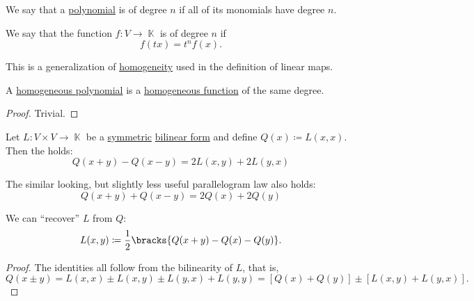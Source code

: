 \begin{definition}\label{def:homogeneous_polynomial}\mimprovised
  We say that a \hyperref[def:polynomial_algebra]{polynomial} is  of degree \( n \) if all of its monomials have degree \( n \).
\end{definition}

\begin{definition}\label{def:homogenous_function}\mimprovised
  We say that the function \( f: V \to \BbbK \) is  of degree \( n \) if
  \begin{equation*}
    f(t x) = t^n f(x).
  \end{equation*}

  This is a generalization of \hyperref[eq:def:semimodule/homomorphism/homogeneity]{homogeneity} used in the definition of linear maps.
\end{definition}

\begin{proposition}\label{thm:homogeneous_polynomial_is_homogeneous_function}
  A \hyperref[def:homogeneous_polynomial]{homogeneous polynomial} is a \hyperref[def:homogenous_function]{homogeneous function} of the same degree.
\end{proposition}
\begin{proof}
  Trivial.
\end{proof}

\begin{proposition}\label{thm:polarization_identity}
  Let \( L: V \times V \to \BbbK \) be a \hyperref[def:symmetric_function]{symmetric} \hyperref[def:bilinear_form]{bilinear form} and define \( Q(x) \coloneqq L(x, x) \). Then the  holds:
  \begin{equation}\label{thm:polarization_identity/polarization_identity}
    Q(x + y) - Q(x - y) = 2 L(x, y) + 2 L(y, x)
  \end{equation}

  The similar looking, but slightly less useful parallelogram law also holds:
  \begin{equation}\label{thm:polarization_identity/parallelogram_law}
    Q(x + y) + Q(x - y) = 2 Q(x) + 2 Q(y)
  \end{equation}

  We can \enquote{recover} \( L \) from \( Q \):
  \begin{equation}\label{thm:polarization_identity/definition}
    L(x, y) \coloneqq \frac 1 2 \bracks{ Q(x + y) - Q(x) - Q(y) }.
  \end{equation}
\end{proposition}
\begin{proof}
  The identities all follow from the bilinearity of \( L \), that is,
  \begin{equation*}
    Q(x \pm y)
    =
    L(x, x) \pm L(x, y) \pm L(y, x) + L(y, y)
    =
    [Q(x) + Q(y)] \pm [L(x, y) + L(y, x)].
  \end{equation*}
\end{proof}


